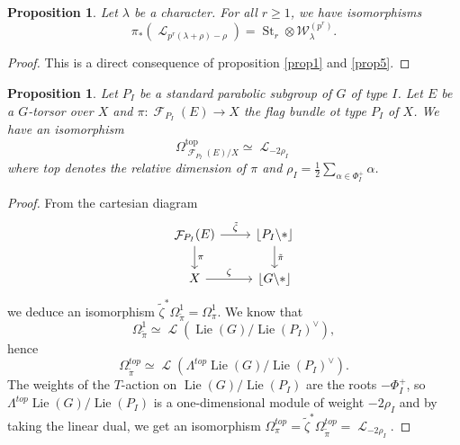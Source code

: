 \documentclass[11pt]{amsart}
\numberwithin{subsection}{section}
\numberwithin{figure}{section}
\numberwithin{table}{section}
\theoremstyle{1}
\newtheorem{proposition}[theorem]{Proposition}
\theoremstyle{2}
\DeclareMathOperator{\Lie}{Lie}
\DeclareMathOperator{\St}{St}
\DeclareMathOperator{\Lc}{\mathcal{L}}
\DeclareMathOperator{\Fc}{\mathcal{F}}
\begin{document}
\begin{proposition}
Let $\lambda$ be a character. For all $r\geq 1$, we have isomorphisms
\begin{equation*}
\pi_*(\Lc_{p^r(\lambda+\rho)-\rho}) = \St_r \otimes \mathcal{W}_{\lambda}^{(p^r)}.
\end{equation*}
\end{proposition}
\begin{proof}
This is a direct consequence of proposition \ref{prop1} and \ref{prop5}.
\end{proof}
\begin{proposition}
Let $P_I$ be a standard parabolic subgroup of $G$ of type $I$. Let $E$ be a $G$-torsor over $X$ and $\pi : \Fc_{P_I}(E) \rightarrow X$ the flag bundle ot type $P_I$ of $X$. We have an isomorphism
\begin{equation*}
\Omega^{\text{top}}_{\Fc_{P_I}(E)/X} \simeq \Lc_{-2\rho_I}
\end{equation*}
where top denotes the relative dimension of $\pi$ and $\rho_I = \frac{1}{2} \sum_{\alpha \in \Phi^+_I} \alpha$.
\end{proposition}
\begin{proof}
From the cartesian diagram
\begin{equation*}
\begin{tikzcd}
\Fc_{P_I}(E) \arrow[d,"\pi"] \arrow[r,"\tilde{\zeta}"] & \lfloor P_I \backslash * \rfloor \arrow[d,"\tilde{\pi}"] \\
X \arrow[r,"\zeta"] & \lfloor G \backslash * \rfloor
\end{tikzcd}
\end{equation*}
we deduce an isomorphism $\tilde{\zeta}^*\Omega^1_{\tilde{\pi}} = \Omega^1_{\pi}$. We know that
\begin{equation*}
\Omega^{1}_{\tilde{\pi}} \simeq \Lc(\Lie(G)/\Lie(P_I)^{\vee}),
\end{equation*}
hence
\begin{equation*}
\Omega^{top}_{\tilde{\pi}} \simeq \Lc(\Lambda^{top}\Lie(G)/\Lie(P_I)^{\vee}).
\end{equation*}
The weights of the $T$-action on $\Lie(G)/\Lie(P_I)$ are the roots $-\Phi^+_I$, so $\Lambda^{top}\Lie(G)/\Lie(P_I)$ is a one-dimensional module of weight $-2\rho_I$ and by taking the linear dual, we get an isomorphism $\Omega^{top}_{\pi} =\tilde{\zeta}^*\Omega^{top}_{\tilde{\pi}} = \Lc_{-2\rho_I}$.
\end{proof}
\end{document}
